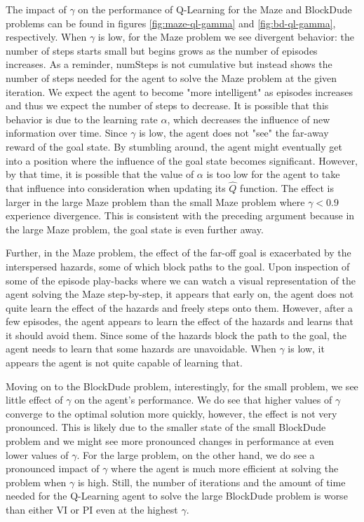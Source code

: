 \documentclass{article}
\begin{document}
The impact of $\gamma$ on the performance of Q-Learning for the Maze and BlockDude problems can be found in figures
\ref{fig:maze-ql-gamma} and \ref{fig:bd-ql-gamma}, respectively. When $\gamma$ is low, for the Maze problem we see divergent
behavior: the number of steps starts small but begins grows as the number of episodes increases. As a reminder, numSteps is
not cumulative but instead shows the number of steps needed for the agent to solve the Maze problem at the given iteration.
We expect the agent to become "more intelligent" as episodes increases and thus we expect the number of steps to decrease.
It is possible that this behavior
is due to the learning rate $\alpha$, which decreases the influence of new information over time. Since $\gamma$ is low,
the agent does not "see" the far-away reward of the goal state. By stumbling around, the agent might eventually get into a
position where the influence of the goal state becomes significant. However, by that time, it is possible that the
value of $\alpha$ is too low for the agent to take that influence into consideration when updating its $\hat{Q}$ function.
The effect is larger in the large Maze problem than the small Maze problem where $\gamma < 0.9$ experience divergence.
This is consistent with the preceding argument because in the large Maze problem, the goal state is even further away.

Further, in the Maze problem, the effect of the far-off goal is exacerbated by the interspersed hazards, some of which block
paths to the goal. Upon inspection of some of the episode play-backs where we can watch a visual representation of the agent
solving the Maze step-by-step, it appears that early on, the agent does not quite learn the effect of the hazards and freely
steps onto them. However, after a few episodes, the agent appears to learn the effect of the hazards and learns that it should
avoid them. Since some of the hazards block the path to the goal, the agent needs to learn that some hazards are unavoidable.
When $\gamma$ is low, it appears the agent is not quite capable of learning that.

Moving on to the BlockDude problem, interestingly, for the small problem, we see little effect of $\gamma$ on the agent's
performance. We do see that higher values of $\gamma$ converge to the optimal solution more quickly, however, the effect is
not very  pronounced. This is likely due to the smaller state of the small BlockDude problem and we might see more pronounced
changes in performance at even lower values of $\gamma$. For the large problem, on the other hand, we do see a pronounced
impact of $\gamma$ where the agent is much more efficient at solving the problem when $\gamma$ is high. Still, the number
of iterations and the amount of time needed for the Q-Learning agent to solve the large BlockDude problem is worse than either VI
or PI even at the highest $\gamma$.
\end{document}
